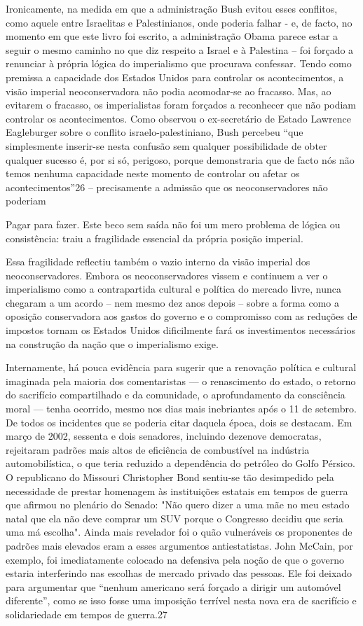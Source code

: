  \par 
Ironicamente, na medida em que a administração Bush evitou esses conflitos, como aquele entre Israelitas e Palestinianos, onde poderia falhar - e, de facto, no momento em que este livro foi escrito, a administração Obama parece estar a seguir o mesmo caminho no que diz respeito a Israel e à Palestina – foi forçado a renunciar à própria lógica do imperialismo que procurava confessar. Tendo como premissa a capacidade dos Estados Unidos para controlar os acontecimentos, a visão imperial neoconservadora não podia acomodar-se ao fracasso. Mas, ao evitarem o fracasso, os imperialistas foram forçados a reconhecer que não podiam controlar os acontecimentos. Como observou o ex-secretário de Estado Lawrence Eagleburger sobre o conflito israelo-palestiniano, Bush percebeu “que simplesmente inserir-se nesta confusão sem qualquer possibilidade de obter qualquer sucesso é, por si só, perigoso, porque demonstraria que de facto nós não temos nenhuma capacidade neste momento de controlar ou afetar os acontecimentos”26 – precisamente a admissão que os neoconservadores não poderiam
 \par 
Pagar para fazer. Este beco sem saída não foi um mero problema de lógica ou consistência: traiu a fragilidade essencial da própria posição imperial.
 \par 
Essa fragilidade reflectiu também o vazio interno da visão imperial dos neoconservadores. Embora os neoconservadores vissem e continuem a ver o imperialismo como a contrapartida cultural e política do mercado livre, nunca chegaram a um acordo – nem mesmo dez anos depois – sobre a forma como a oposição conservadora aos gastos do governo e o compromisso com as reduções de impostos tornam os Estados Unidos dificilmente fará os investimentos necessários na construção da nação que o imperialismo exige.
 \par 
Internamente, há pouca evidência para sugerir que a renovação política e cultural imaginada pela maioria dos comentaristas — o renascimento do estado, o retorno do sacrifício compartilhado e da comunidade, o aprofundamento da consciência moral — tenha ocorrido, mesmo nos dias mais inebriantes após o {\color{blue}11} de setembro. De todos os incidentes que se poderia citar daquela época, dois se destacam. Em março de 2002, sessenta e dois senadores, incluindo dezenove democratas, rejeitaram padrões mais altos de eficiência de combustível na indústria automobilística, o que teria reduzido a dependência do petróleo do Golfo Pérsico. O republicano do Missouri Christopher Bond sentiu-se tão desimpedido pela necessidade de prestar homenagem às instituições estatais em tempos de guerra que afirmou no plenário do Senado: "Não quero dizer a uma mãe no meu estado natal que ela não deve comprar um SUV porque o Congresso decidiu que seria uma má escolha". Ainda mais revelador foi o quão vulneráveis ​​os proponentes de padrões mais elevados eram a esses argumentos antiestatistas. John McCain, por exemplo, foi imediatamente colocado na defensiva pela noção de que o governo estaria interferindo nas escolhas de mercado privado das pessoas. Ele foi deixado para argumentar que “nenhum americano será forçado a dirigir um automóvel diferente”, como se isso fosse uma imposição terrível nesta nova era de sacrifício e solidariedade em tempos de guerra.{\color{blue}27}
